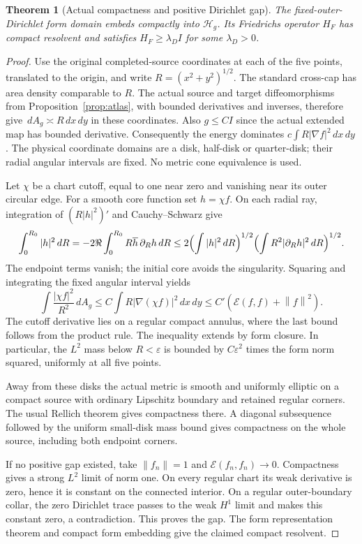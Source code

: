 \documentclass[11pt]{article}
\theoremstyle{readable}
\newtheorem{theorem}{Theorem}[section]
\theoremstyle{remark}\newtheorem{remark}[theorem]{Remark}
\newcommand{\dd}{\,d}\newcommand{\norm}[1]{\left\lVert#1\right\rVert}
\begin{document}
\begin{theorem}[Actual compactness and positive Dirichlet gap]\label{thm:compact}
The fixed-outer-Dirichlet form domain embeds compactly into $\mathcal H_g$.
Its Friedrichs operator $H_F$ has compact resolvent and satisfies
$H_F\geq\lambda_D I$ for some $\lambda_D>0$.
\end{theorem}
\begin{proof}
Use the original completed-source coordinates at each of the five points,
translated to the origin, and write $R=(x^2+y^2)^{1/2}$.
The standard cross-cap has area density comparable to $R$.
The actual source and target diffeomorphisms from
Proposition~\ref{prop:atlas}, with bounded derivatives and inverses, therefore
give $\dd A_g\asymp R\dd x\dd y$ in these coordinates.
Also $g\leq C I$ since the actual extended map has bounded derivative.
Consequently the energy dominates $c\int R|\nabla f|^2\dd x\dd y$.
The physical coordinate domains are a disk, half-disk or quarter-disk;
their radial angular intervals are fixed. No metric cone equivalence is used.

Let $\chi$ be a chart cutoff, equal to one near zero and vanishing near its
outer circular edge. For a smooth core function set $h=\chi f$.
On each radial ray, integration of $(R|h|^2)'$ and Cauchy--Schwarz give
\[
 \int_0^{R_0}|h|^2\dd R
 =-2\Re\int_0^{R_0}R\overline h\,\partial_Rh\dd R
 \leq2\Bigl(\int|h|^2\dd R\Bigr)^{1/2}
          \Bigl(\int R^2|\partial_Rh|^2\dd R\Bigr)^{1/2}.
\]
The endpoint terms vanish; the initial core avoids the singularity.
Squaring and integrating the fixed angular interval yields
\[
 \int\frac{|\chi f|^2}{R^2}\dd A_g
 \leq C\int R|\nabla(\chi f)|^2\dd x\dd y
 \leq C'(\mathcal E(f,f)+\norm f^2).
\]
The cutoff derivative lies on a regular compact annulus, where the last
bound follows from the product rule. The inequality extends by form closure.
In particular, the $L^2$ mass below $R<\varepsilon$ is bounded by
$C\varepsilon^2$ times the form norm squared, uniformly at all five points.

Away from these disks the actual metric is smooth and uniformly elliptic
on a compact source with ordinary Lipschitz boundary and retained regular
corners. The usual Rellich theorem \cite{brezis} gives compactness there.
A diagonal subsequence followed by the uniform small-disk mass bound gives
compactness on the whole source, including both endpoint corners.

If no positive gap existed, take $\norm{f_n}=1$ and
$\mathcal E(f_n,f_n)\to0$. Compactness gives a strong $L^2$ limit of norm
one. On every regular chart its weak derivative is zero, hence it is
constant on the connected interior. On a regular outer-boundary collar,
the zero Dirichlet trace passes to the weak $H^1$ limit and makes this
constant zero, a contradiction. This proves the gap. The form representation
theorem and compact form embedding give the claimed compact resolvent.
\end{proof}
\end{document}
